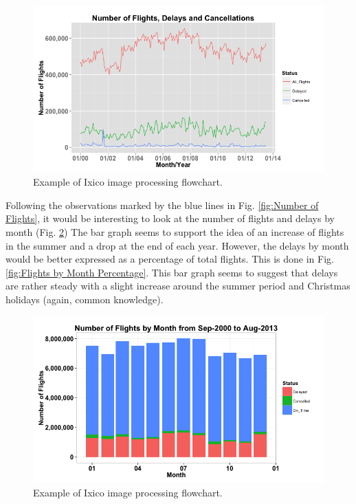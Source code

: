 \documentclass[11pt,twoside,titlepage]{article}
\begin{document}
\begin{figure}[h!]
        \centering
                \includegraphics[width=16cm]{Number_of_Flights2.png}
        \caption{Example of Ixico image processing flowchart.}\label{fig:Number of Flights + Delays}
\end{figure}

Following the observations marked by the blue lines in Fig. \ref{fig:Number of Flights}, it would be interesting to look at the number of flights and delays by month (Fig. \ref{fig:Flights by Month}) The bar graph seems to support the idea of an increase of flights in the summer and a drop at the end of each year. However, the delays by month would be better expressed as a percentage of total flights. This is done in Fig. \ref{fig:Flights by Month Percentage}. This bar graph seems to suggest that delays are rather steady with a slight increase around the summer period and Christmas holidays (again, common knowledge).


\begin{figure}[h!]
        \centering
                \includegraphics[width=16cm]{Bar1.png}
        \caption{Example of Ixico image processing flowchart.}\label{fig:Flights by Month}
\end{figure}
\end{document}
